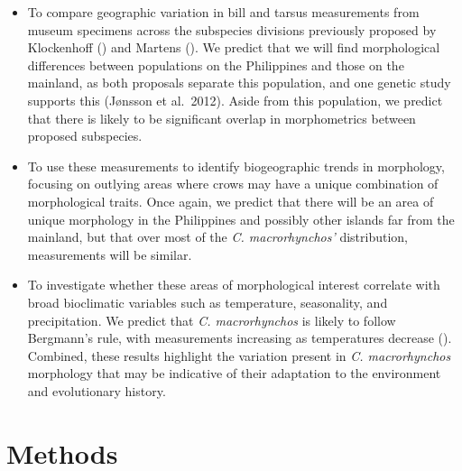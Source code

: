 \documentclass[10pt,a4paper]{article}
\begin{document}
\begin{itemize}
\item
  To compare geographic variation in bill and tarsus measurements from museum specimens across the subspecies divisions previously proposed by Klockenhoff () and Martens ().
  We predict that we will find morphological differences between populations on the Philippines and those on the mainland, as both proposals separate this population, and one genetic study supports this (Jønsson et al.~2012).
  Aside from this population, we predict that there is likely to be significant overlap in morphometrics between proposed subspecies.
\item
  To use these measurements to identify biogeographic trends in morphology, focusing on outlying areas where crows may have a unique combination of morphological traits.
  Once again, we predict that there will be an area of unique morphology in the Philippines and possibly other islands far from the mainland, but that over most of the \emph{C. macrorhynchos'} distribution, measurements will be similar.
\item
  To investigate whether these areas of morphological interest correlate with broad bioclimatic variables such as temperature, seasonality, and precipitation.
  We predict that \emph{C. macrorhynchos} is likely to follow Bergmann's rule, with measurements increasing as temperatures decrease ().
  Combined, these results highlight the variation present in \emph{C. macrorhynchos} morphology that may be indicative of their adaptation to the environment and evolutionary history.
\end{itemize}

\section{Methods}\label{methods}
\end{document}
